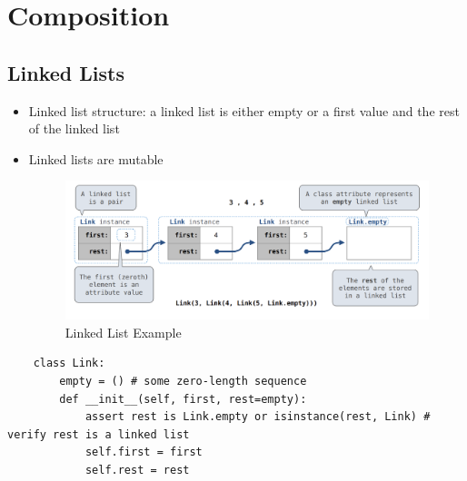\chapter{Composition}

\section{Linked Lists}
\begin{itemize}
    \item Linked list structure: a linked list is either empty or a first value and the rest of the linked list
    \item Linked lists are mutable
    \medskip
	\begin{figure}[H]
	\includegraphics[width=1\linewidth]{figures/linked_list_example.png}
	\caption{Linked List Example}
	\end{figure}
\end{itemize}
\begin{verbatim}
    class Link:
        empty = () # some zero-length sequence
        def __init__(self, first, rest=empty):
            assert rest is Link.empty or isinstance(rest, Link) # verify rest is a linked list
            self.first = first
            self.rest = rest
\end{verbatim}

